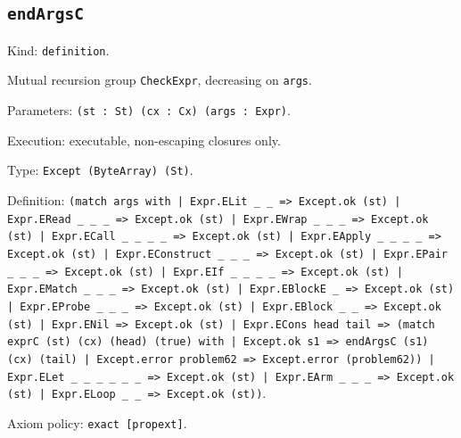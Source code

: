 \documentclass[11pt]{article}
\begin{document}
\subsection*{\texttt{endArgsC}}
\noindent Kind: \texttt{definition}.\par
\noindent Mutual recursion group \texttt{CheckExpr}, decreasing on \texttt{args}.\par
\noindent Parameters: \texttt{(st : St) (cx : Cx) (args : Expr)}.\par
\noindent Execution: executable, non-escaping closures only.\par
\noindent Type: \texttt{Except (ByteArray) (St)}.\par
\noindent Definition: \texttt{(match args with | Expr.ELit \_ \_ => Except.ok (st) | Expr.ERead \_ \_ \_ => Except.ok (st) | Expr.EWrap \_ \_ \_ => Except.ok (st) | Expr.ECall \_ \_ \_ \_ => Except.ok (st) | Expr.EApply \_ \_ \_ \_ => Except.ok (st) | Expr.EConstruct \_ \_ \_ => Except.ok (st) | Expr.EPair \_ \_ \_ => Except.ok (st) | Expr.EIf \_ \_ \_ \_ => Except.ok (st) | Expr.EMatch \_ \_ \_ => Except.ok (st) | Expr.EBlockE \_ => Except.ok (st) | Expr.EProbe \_ \_ \_ => Except.ok (st) | Expr.EBlock \_ \_ => Except.ok (st) | Expr.ENil => Except.ok (st) | Expr.ECons head tail => (match exprC (st) (cx) (head) (true) with | Except.ok s1 => endArgsC (s1) (cx) (tail) | Except.error problem62 => Except.error (problem62)) | Expr.ELet \_ \_ \_ \_ \_ \_ => Except.ok (st) | Expr.EArm \_ \_ \_ => Except.ok (st) | Expr.ELoop \_ \_ => Except.ok (st))}.\par
\noindent Axiom policy: \texttt{exact [propext]}.\par
\end{document}
